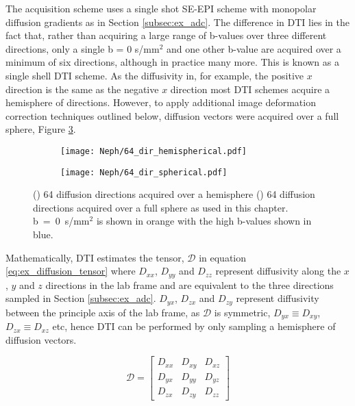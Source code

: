 The acquisition scheme uses a single shot \ac{SE}-\ac{EPI} scheme with monopolar diffusion gradients as in Section \ref{subsec:ex_adc}. The difference in \ac{DTI} lies in the fact that, rather than acquiring a large range of b-values over three different directions, only a single b = 0 s/mm$^2$ and one other b-value are acquired over a minimum of six directions, although in practice many more. This is known as a single shell \ac{DTI} scheme. As the diffusivity in, for example, the positive $x$ direction is the same as the negative $x$ direction most \ac{DTI} schemes acquire a hemisphere of directions. However, to apply additional image deformation correction techniques outlined below, diffusion vectors were acquired over a full sphere, Figure \ref{fig:ex_dti_vectors}.

\begin{figure}[H]
	\centering
	\begin{subfigure}[c]{0.47\textwidth}
		\centering
		\texttt{[image: Neph/64\_dir\_hemispherical.pdf]}
		\caption{}
		\label{fig:ex_dti_vectors_half}
	\end{subfigure}
	\hfill
	\begin{subfigure}[c]{0.47\textwidth}
		\centering
		\texttt{[image: Neph/64\_dir\_spherical.pdf]}
		\caption{}
		\label{fig:ex_dti_vectors_full}
	\end{subfigure}
	\caption{() 64 diffusion directions acquired over a hemisphere () 64 diffusion directions acquired over a full sphere as used in this chapter. b~=~0~s/mm$^2$ is shown in orange with the high b-values shown in blue. }
	\label{fig:ex_dti_vectors}
\end{figure}

Mathematically, \ac{DTI} estimates the tensor, $\mathscr{D}$ in equation \eqref{eq:ex_diffusion_tensor} where $D_{xx}$, $D_{yy}$ and $D_{zz}$ represent diffusivity along the $x$, $y$ and $z$ directions in the lab frame and are equivalent to the three directions sampled in Section \ref{subsec:ex_adc}. $D_{yx}$, $D_{zx}$ and $D_{zy}$ represent diffusivity between the principle axis of the lab frame, as $\mathscr{D}$ is symmetric, $D_{yx} \equiv D_{xy}$, $D_{zx} \equiv D_{xz}$ etc, hence \ac{DTI} can be performed by only sampling a hemisphere of diffusion vectors.

\begin{equation}
	\mathscr{D} = 
	\begin{bmatrix}
		D_{xx} & D_{xy} & D_{xz}\\ 
		D_{yx} & D_{yy} & D_{yz}\\ 
		D_{zx} & D_{zy} & D_{zz}
	\end{bmatrix}
\label{eq:ex_diffusion_tensor}
\end{equation}

